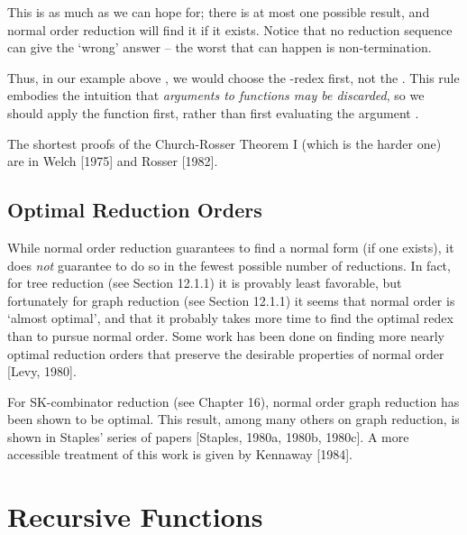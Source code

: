 
\noindent This is as much as we can hope for; there is at most one possible result, and normal order reduction will find it if it exists. Notice that no reduction sequence can give the `wrong' answer -- the worst that can happen is non-termination.


\noindent Thus, in our example above , we would choose the -redex first, not the . This rule embodies the intuition that \textit{arguments to functions may be discarded}, so we should apply the function  first, rather than first evaluating the argument .

The shortest proofs of the Church-Rosser Theorem I (which is the harder one) are in Welch [1975] and Rosser [1982].

\subsection{Optimal Reduction Orders}

While normal order reduction guarantees to find a normal form (if one exists), it does \textit{not} guarantee to do so in the fewest possible number of reductions. In fact, for tree reduction (see Section 12.1.1) it is provably least favorable, but fortunately for graph reduction (see Section 12.1.1) it seems that normal order is `almost optimal', and that it probably takes more time to find the optimal redex than to pursue normal order. Some work has been done on finding more nearly optimal reduction orders that preserve the desirable properties of normal order [Levy, 1980].

For SK-combinator reduction (see Chapter 16), normal order graph reduction has been shown to be optimal. This result, among many others on graph reduction, is shown in Staples' series of papers [Staples, 1980a, 1980b, 1980c]. A more accessible treatment of this work is given by Kennaway [1984].

\section{Recursive Functions}


